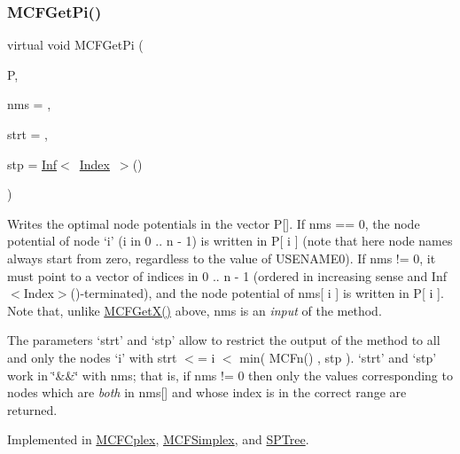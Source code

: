 \subsubsection{\texorpdfstring{M\+C\+F\+Get\+Pi()}{MCFGetPi()}\hspace{0.1cm}{\footnotesize\ttfamily [1/2]}}
{\footnotesize\ttfamily virtual void M\+C\+F\+Get\+Pi (\begin{DoxyParamCaption}\item[{\mbox{\hyperlink{class_m_c_f_class_a62409402be4e4b301e1a568f99f877be}{C\+Row}}}]{P,  }\item[{\mbox{\hyperlink{class_m_c_f_class_a81575b2d4e4d5636b17170432150ae69}{c\+Index\+\_\+\+Set}}}]{nms = {},  }\item[{\mbox{\hyperlink{class_m_c_f_class_a76aaabb20535c51a2752b93f6c38fe54}{c\+Index}}}]{strt = {},  }\item[{\mbox{\hyperlink{class_m_c_f_class_ad53d6229d7ec28555a9c9c2fd9abf773}{Index}}}]{stp = {\ttfamily \mbox{\hyperlink{class_o_p_ttypes__di__unipi__it_1_1_inf}{Inf}}$<$~\mbox{\hyperlink{class_m_c_f_class_ad53d6229d7ec28555a9c9c2fd9abf773}{Index}}~$>$()} }\end{DoxyParamCaption})\hspace{0.3cm}{\ttfamily [pure virtual]}}

Writes the optimal node potentials in the vector P\mbox{[}\mbox{]}. If nms == 0, the node potential of node `i' (i in 0 .. n -\/ 1) is written in P\mbox{[} i \mbox{]} (note that here node names always start from zero, regardless to the value of U\+S\+E\+N\+A\+M\+E0). If nms != 0, it must point to a vector of indices in 0 .. n -\/ 1 (ordered in increasing sense and Inf$<$\+Index$>$()-\/terminated), and the node potential of nms\mbox{[} i \mbox{]} is written in P\mbox{[} i \mbox{]}. Note that, unlike \mbox{\hyperlink{class_m_c_f_class_a4eb307e0707adaef99bb0e08c9e10eb8}{M\+C\+F\+Get\+X()}} above, nms is an {\itshape input} of the method.

The parameters `strt' and `stp' allow to restrict the output of the method to all and only the nodes `i' with strt $<$= i $<$ min( M\+C\+Fn() , stp ). `strt' and `stp' work in \char`\"{}\&\&\char`\"{} with nms; that is, if nms != 0 then only the values corresponding to nodes which are {\itshape both} in nms\mbox{[}\mbox{]} and whose index is in the correct range are returned. 

Implemented in \mbox{\hyperlink{class_m_c_f_cplex_abb97afaf7df33019f1b728138a254d6d}{M\+C\+F\+Cplex}}, \mbox{\hyperlink{class_m_c_f_simplex_abb97afaf7df33019f1b728138a254d6d}{M\+C\+F\+Simplex}}, and \mbox{\hyperlink{class_s_p_tree_a59f02d7f6b2b033bf7a9c45774a26397}{S\+P\+Tree}}.

